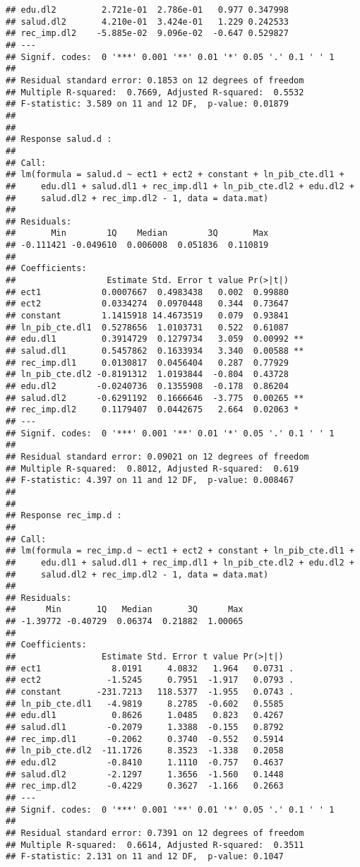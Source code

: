 \documentclass[]{book}
\theoremstyle{definition}
\theoremstyle{definition}
\theoremstyle{definition}
\theoremstyle{remark}
\begin{document}
\begin{verbatim}
## edu.dl2         2.721e-01  2.786e-01   0.977 0.347998    
## salud.dl2       4.210e-01  3.424e-01   1.229 0.242533    
## rec_imp.dl2    -5.885e-02  9.096e-02  -0.647 0.529827    
## ---
## Signif. codes:  0 '***' 0.001 '**' 0.01 '*' 0.05 '.' 0.1 ' ' 1
## 
## Residual standard error: 0.1853 on 12 degrees of freedom
## Multiple R-squared:  0.7669, Adjusted R-squared:  0.5532 
## F-statistic: 3.589 on 11 and 12 DF,  p-value: 0.01879
## 
## 
## Response salud.d :
## 
## Call:
## lm(formula = salud.d ~ ect1 + ect2 + constant + ln_pib_cte.dl1 + 
##     edu.dl1 + salud.dl1 + rec_imp.dl1 + ln_pib_cte.dl2 + edu.dl2 + 
##     salud.dl2 + rec_imp.dl2 - 1, data = data.mat)
## 
## Residuals:
##       Min        1Q    Median        3Q       Max 
## -0.111421 -0.049610  0.006008  0.051836  0.110819 
## 
## Coefficients:
##                  Estimate Std. Error t value Pr(>|t|)   
## ect1            0.0007667  0.4983438   0.002  0.99880   
## ect2            0.0334274  0.0970448   0.344  0.73647   
## constant        1.1415918 14.4673519   0.079  0.93841   
## ln_pib_cte.dl1  0.5278656  1.0103731   0.522  0.61087   
## edu.dl1         0.3914729  0.1279734   3.059  0.00992 **
## salud.dl1       0.5457862  0.1633934   3.340  0.00588 **
## rec_imp.dl1     0.0130817  0.0456404   0.287  0.77929   
## ln_pib_cte.dl2 -0.8191312  1.0193844  -0.804  0.43728   
## edu.dl2        -0.0240736  0.1355908  -0.178  0.86204   
## salud.dl2      -0.6291192  0.1666646  -3.775  0.00265 **
## rec_imp.dl2     0.1179407  0.0442675   2.664  0.02063 * 
## ---
## Signif. codes:  0 '***' 0.001 '**' 0.01 '*' 0.05 '.' 0.1 ' ' 1
## 
## Residual standard error: 0.09021 on 12 degrees of freedom
## Multiple R-squared:  0.8012, Adjusted R-squared:  0.619 
## F-statistic: 4.397 on 11 and 12 DF,  p-value: 0.008467
## 
## 
## Response rec_imp.d :
## 
## Call:
## lm(formula = rec_imp.d ~ ect1 + ect2 + constant + ln_pib_cte.dl1 + 
##     edu.dl1 + salud.dl1 + rec_imp.dl1 + ln_pib_cte.dl2 + edu.dl2 + 
##     salud.dl2 + rec_imp.dl2 - 1, data = data.mat)
## 
## Residuals:
##      Min       1Q   Median       3Q      Max 
## -1.39772 -0.40729  0.06374  0.21882  1.00065 
## 
## Coefficients:
##                 Estimate Std. Error t value Pr(>|t|)  
## ect1              8.0191     4.0832   1.964   0.0731 .
## ect2             -1.5245     0.7951  -1.917   0.0793 .
## constant       -231.7213   118.5377  -1.955   0.0743 .
## ln_pib_cte.dl1   -4.9819     8.2785  -0.602   0.5585  
## edu.dl1           0.8626     1.0485   0.823   0.4267  
## salud.dl1        -0.2079     1.3388  -0.155   0.8792  
## rec_imp.dl1      -0.2062     0.3740  -0.552   0.5914  
## ln_pib_cte.dl2  -11.1726     8.3523  -1.338   0.2058  
## edu.dl2          -0.8410     1.1110  -0.757   0.4637  
## salud.dl2        -2.1297     1.3656  -1.560   0.1448  
## rec_imp.dl2      -0.4229     0.3627  -1.166   0.2663  
## ---
## Signif. codes:  0 '***' 0.001 '**' 0.01 '*' 0.05 '.' 0.1 ' ' 1
## 
## Residual standard error: 0.7391 on 12 degrees of freedom
## Multiple R-squared:  0.6614, Adjusted R-squared:  0.3511 
## F-statistic: 2.131 on 11 and 12 DF,  p-value: 0.1047
\end{verbatim}
\end{document}
